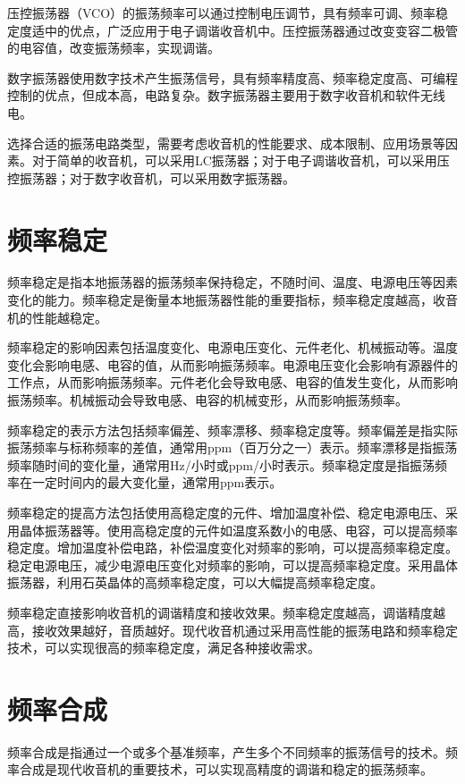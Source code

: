 \documentclass[12pt,UTF8]{ctexbook}
\begin{document}
压控振荡器（VCO）的振荡频率可以通过控制电压调节，具有频率可调、频率稳定度适中的优点，广泛应用于电子调谐收音机中。压控振荡器通过改变变容二极管的电容值，改变振荡频率，实现调谐。

数字振荡器使用数字技术产生振荡信号，具有频率精度高、频率稳定度高、可编程控制的优点，但成本高，电路复杂。数字振荡器主要用于数字收音机和软件无线电。

选择合适的振荡电路类型，需要考虑收音机的性能要求、成本限制、应用场景等因素。对于简单的收音机，可以采用LC振荡器；对于电子调谐收音机，可以采用压控振荡器；对于数字收音机，可以采用数字振荡器。

\section{频率稳定}

频率稳定是指本地振荡器的振荡频率保持稳定，不随时间、温度、电源电压等因素变化的能力。频率稳定是衡量本地振荡器性能的重要指标，频率稳定度越高，收音机的性能越稳定。

频率稳定的影响因素包括温度变化、电源电压变化、元件老化、机械振动等。温度变化会影响电感、电容的值，从而影响振荡频率。电源电压变化会影响有源器件的工作点，从而影响振荡频率。元件老化会导致电感、电容的值发生变化，从而影响振荡频率。机械振动会导致电感、电容的机械变形，从而影响振荡频率。

频率稳定的表示方法包括频率偏差、频率漂移、频率稳定度等。频率偏差是指实际振荡频率与标称频率的差值，通常用ppm（百万分之一）表示。频率漂移是指振荡频率随时间的变化量，通常用Hz/小时或ppm/小时表示。频率稳定度是指振荡频率在一定时间内的最大变化量，通常用ppm表示。

频率稳定的提高方法包括使用高稳定度的元件、增加温度补偿、稳定电源电压、采用晶体振荡器等。使用高稳定度的元件如温度系数小的电感、电容，可以提高频率稳定度。增加温度补偿电路，补偿温度变化对频率的影响，可以提高频率稳定度。稳定电源电压，减少电源电压变化对频率的影响，可以提高频率稳定度。采用晶体振荡器，利用石英晶体的高频率稳定度，可以大幅提高频率稳定度。

频率稳定直接影响收音机的调谐精度和接收效果。频率稳定度越高，调谐精度越高，接收效果越好，音质越好。现代收音机通过采用高性能的振荡电路和频率稳定技术，可以实现很高的频率稳定度，满足各种接收需求。

\section{频率合成}

频率合成是指通过一个或多个基准频率，产生多个不同频率的振荡信号的技术。频率合成是现代收音机的重要技术，可以实现高精度的调谐和稳定的振荡频率。
\end{document}

